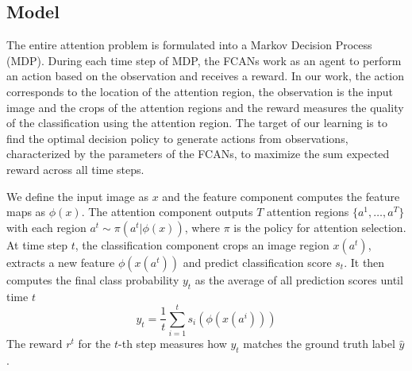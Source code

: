 \documentclass[10pt,twocolumn,letterpaper]{article}
\begin{document}


\subsection{Model}
The entire attention problem is formulated into a Markov Decision Process (MDP).
During each time step of MDP, the FCANs work as an agent to perform an action based on the observation and receives a reward.
In our work, the action corresponds to the location of the attention region, the observation is the input image and the crops of the attention regions and the reward measures the quality of the classification using the attention region.
The target of our learning is to find the optimal decision policy to generate actions from observations, characterized by the parameters of the FCANs, to maximize the sum expected reward across all time steps.

We define the input image as $x$ and the feature component computes the feature maps as $\phi(x)$.
The attention component outputs $T$ attention regions $\{a^1, \ldots, a^T\}$ with each region $a^t \sim \pi(a^t | \phi(x))$, where $\pi$ is the policy for attention selection.
At time step $t$, the classification component crops an image region $x(a^t)$, extracts a new feature $\phi(x(a^t))$ and predict classification score $s_t$.
It then computes the final class probability $y_t$ as the average of all prediction scores until time $t$
\begin{equation}
y_t = \frac{1}{t} \sum_{i=1}^t s_i(\phi(x(a^i)))
\end{equation}
The reward $r^t$ for the $t$-th step measures how $y_t$ matches the ground truth label $\hat{y}$.

\end{document}
